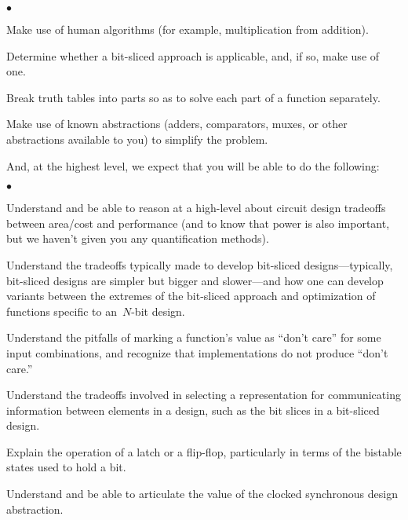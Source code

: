 \begin{list}{$\bullet$}{\setlength{\itemsep}{0pt}\setlength{\parskip}{0pt}%
\setlength{\topsep}{0pt}\setlength{\partopsep}{0pt}\setlength{\parsep}{0pt}}

\item{Make use of human algorithms 
(for example, multiplication from addition).}

\item{Determine whether a bit-sliced approach is applicable, and, if so,
make use of one.}

\item{Break truth tables into parts so as to solve each part of a function 
separately.}

\item{Make use of known abstractions (adders, comparators, muxes, or other
abstractions available to you) to simplify the problem.}

\end{list}

And, at the highest level, we expect that you will be able to do the following:

\begin{list}{$\bullet$}{\setlength{\itemsep}{0pt}\setlength{\parskip}{0pt}%
\setlength{\topsep}{0pt}\setlength{\partopsep}{0pt}\setlength{\parsep}{0pt}}

\item{Understand and be able to reason at a high-level about circuit design
tradeoffs between area/cost and performance (and to know that power is also 
important, but we haven't given you any quantification methods).}

\item{Understand the tradeoffs typically made to develop bit-sliced 
designs---typically, bit-sliced designs are simpler but bigger and 
slower---and how one can develop variants between the extremes of
the bit-sliced approach and optimization of functions specific
to an~\mbox{$N$-bit} design.}

\item{Understand the pitfalls of marking a function's value as ``don't care'' 
for some input combinations, and recognize that implementations do not 
produce ``don't care.''}

\item{Understand the tradeoffs involved in selecting a representation for
communicating information between elements in a design, such as the bit 
slices in a bit-sliced design.}

\item{Explain the operation of a latch or a flip-flop, particularly in 
terms of the bistable states used to hold a bit.}

\item{Understand and be able to articulate the value of the clocked 
synchronous design abstraction.}

\end{list}

